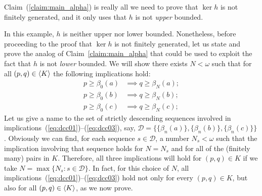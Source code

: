 Claim~(\ref{claim:main_alpha}) is really all we need to prove that
$\ker h$ is not finitely generated, and it only uses that $h$ is 
not \emph{upper} bounded.

In this example, $h$ is neither upper nor lower bounded.
Nonetheless, before proceeding to the proof that $\ker h$ 
is not finitely generated, let us state and prove the analog 
of Claim~\ref{claim:main_alpha} that could be used to exploit the fact that
$h$ is not \emph{lower} bounded.
We will show there exists $N < \omega$ such that 
for all $(p, q) \in \langle K\rangle$ 
the following implications hold:
\begin{align}
  p \geq \beta_0(a) &\implies q \geq \beta_N(a); \label{eq:dcc01}\\
  p \geq \beta_0(b) &\implies q \geq \beta_N(b); \label{eq:dcc02}\\ 
  p \geq \beta_0(c) &\implies q \geq \beta_N(c); \label{eq:dcc03}
\end{align}
Let us give a name to the set of strictly descending 
sequences involved in implications~(\ref{eq:dcc01})--(\ref{eq:dcc03}), say,
$\mathcal D = \{\{\beta_n(a)\}, \{\beta_n(b)\}, \{\beta_n(c)\}\}$.
Obviously we can find, for each sequence $s \in \mathcal D$,
a number $N_s < \omega$ such that the implication involving that sequence 
holds for $N = N_s$ and for all of the (finitely many) pairs in $K$.  
Therefore, all three implications will hold for $(p, q) \in K$ if we take 
$N = \max \{N_{s} : s \in \mathcal D\}$.
In fact, for this choice of $N$, all implications~(\ref{eq:dcc01})--(\ref{eq:dcc03}) hold 
not only for every $(p, q) \in K$, but also for all $(p, q) \in \langle K\rangle$,
as we now prove.

